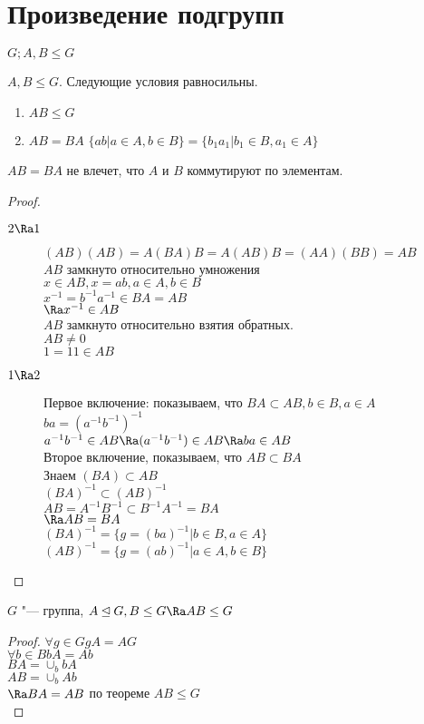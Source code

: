 ﻿\section{Произведение подгрупп}
$G; A, B \le G$\\
\begin{theorem}
$A, B \le G$. Следующие условия равносильны.\\
    \begin{enumerate}
    \item $AB \le G$\\
    \item $AB = BA$
    $\{ab | a \in  A, b \in B\} = \{b_1a_1 | b_1 \in B, a_1 \in A\}$\\
    \end{enumerate}
\end{theorem}
\begin{Rem}
$AB = BA$ не влечет, что $A$ и $B$ коммутируют по элементам.
\end{Rem}
\begin{proof}
\begin{description}
\item[$2 \Ra 1$]
$(AB)(AB) = A(BA)B = A(AB)B = (AA)(BB) = AB$\\
$AB$ замкнуто относительно умножения\\
$x \in AB, x = ab, a\in A, b \in B$\\
$x^{-1} = b^{-1}a^{-1} \in BA = AB$\\
$\Ra x^{-1} \in AB$\\

$AB$ замкнуто относительно взятия обратных.\\
$AB \ne 0$\\
$1 = 11 \in AB$

\item[$1 \Ra 2$]
Первое включение: показываем, что
$BA \subset AB, b \in B, a \in A$\\
$ba = (a^{-1}b^{-1})^{-1}$\\
$a^{-1}b^{-1} \in AB \Ra (a^{-1}b^{-1}) \in AB \Ra ba \in AB$\\

Второе включение, показываем, что
$AB \subset BA$\\
Знаем $(BA) \subset AB$\\
$(BA)^{-1} \subset (AB)^{-1}$\\
$AB = A^{-1}B^{-1} \subset B^{-1}A^{-1} = BA$\\
$\Ra AB = BA$\\

$(BA)^{-1} = \{g = (ba)^{-1}|b \in B, a \in A\}$\\
$(AB)^{-1} = \{g = (ab)^{-1}|a \in A, b \in B\}$\\
\end{description}
\end{proof}
\begin{conseq}
$G$ "--- группа, $A \unlhd G, B \le G \Ra AB \le G$ \\
\end{conseq}
\begin{proof}
$\forall g \in G gA = AG$\\
$\forall b \in B bA = Ab$\\

$BA = \cup_b bA$\\
$AB = \cup_b Ab$\\
$\Ra BA = AB$ по теореме $AB \le G$\\
\end{proof}